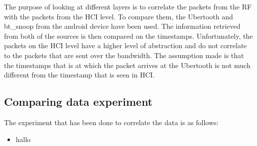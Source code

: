 The purpose of looking at different layers is to correlate the packets from the RF with the packets from the HCI level. To compare them, the Ubertooth and bt\_snoop from the android device have been used. The information retrieved from both of the sources is then compared on the timestamps. Unfortunately, the packets on the HCI level have a higher level of abstraction and do not correlate to the packets that are sent over the bandwidth. The assumption made is that the timestamps that is at which the packet arrives at the Ubertooth is not much different from the timestamp that is seen in HCI.
\subsection{Comparing data experiment}
The experiment that has been done to correlate the data is as follows:
\begin{itemize}
\item hallo
\end{itemize}
